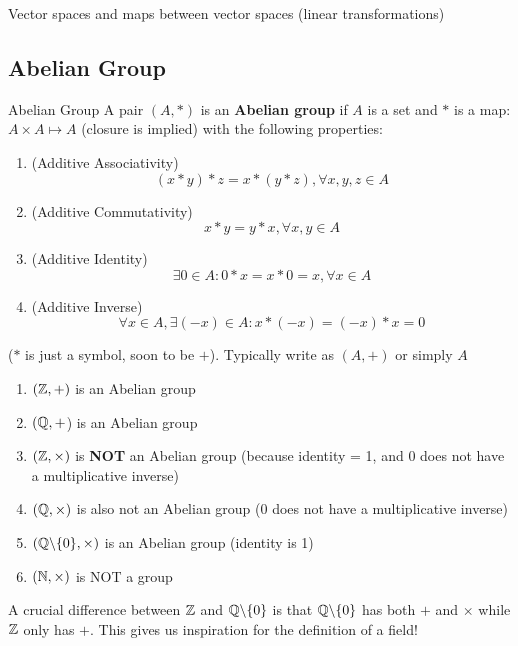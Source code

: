 \begin{goal}
    Vector spaces and maps between vector spaces (linear transformations)
\end{goal}
\subsection{Abelian Group}
\begin{definition} {Abelian Group}
    A pair \((A, *)\) is an \textbf{Abelian group} if \(A\) is a set and \(*\) is a map: \(A \times A \mapsto A\) (closure is implied) with the following properties:
    \begin{enumerate}
        \item (Additive Associativity) \[
                  (x * y) * z = x * (y * z), \forall x, y, z \in A
              \]
        \item (Additive Commutativity) \[
                  x * y = y * x, \forall x, y \in A
              \]
        \item (Additive Identity) \[
                  \exists 0 \in A: 0 * x = x * 0 = x, \forall x \in A
              \]
        \item (Additive Inverse) \[
                  \forall x \in A, \exists (-x) \in A: x * (-x) = (-x) * x = 0
              \]
    \end{enumerate}
\end{definition}

\begin{remark}
    (\(*\) is just a symbol, soon to be \(+\)). Typically write as \((A, +)\) or simply \(A\)
\end{remark}

\begin{example}
    \hfill
    \begin{enumerate}
        \item \((\mathbb{Z}, +)\) is an Abelian group
        \item \((\mathbb{Q}, +\)) is an Abelian group
        \item \((\mathbb{Z}, \times)\) is \textbf{NOT} an Abelian group (because identity = 1, and 0 does not have a multiplicative inverse)
        \item \((\mathbb{Q}, \times)\) is also not an Abelian group (0 does not have a multiplicative inverse)
        \item \((\mathbb{Q}\backslash\{0\}, \times)\) is an Abelian group (identity is 1)
        \item \((\mathbb{N}, \times)\) is NOT a group
    \end{enumerate}
\end{example}
\begin{remark}
    A crucial difference between \(\mathbb{Z}\) and \(\mathbb{Q}\backslash\{0\}\) is that \(\mathbb{Q}\backslash\{0\}\) has both \(+\) and \(\times\) while \(\mathbb{Z}\) only has \(+\). This gives us inspiration for the definition of a field!
\end{remark}

